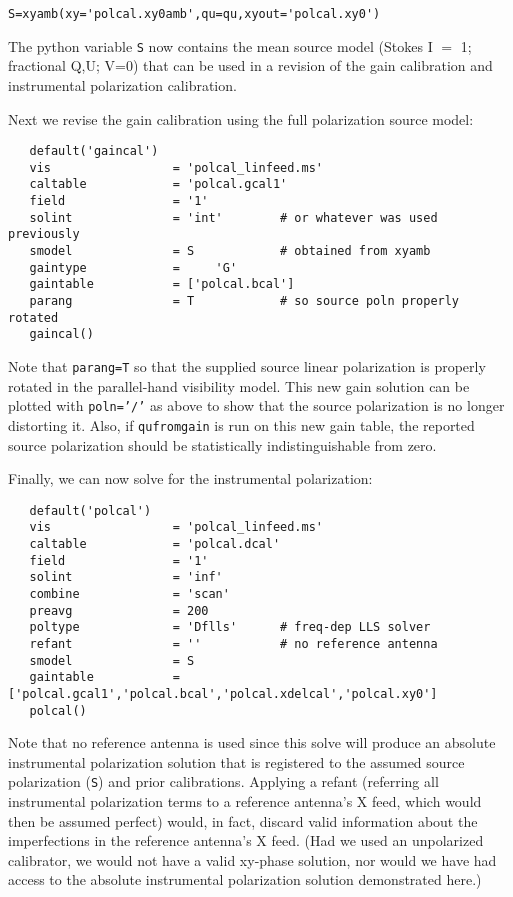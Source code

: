 \small
\begin{verbatim}
S=xyamb(xy='polcal.xy0amb',qu=qu,xyout='polcal.xy0')
\end{verbatim}
\normalsize 

The python variable {\tt S} now contains the mean
source model (Stokes I $=$ 1; fractional Q,U; V=0)
that can be used in a revision of the gain calibration
and instrumental polarization calibration.

Next we revise the gain calibration using the full polarization
source model:

\small
\begin{verbatim}
   default('gaincal')
   vis                 = 'polcal_linfeed.ms'
   caltable            = 'polcal.gcal1'   
   field               = '1'         
   solint              = 'int'        # or whatever was used previously
   smodel              = S            # obtained from xyamb
   gaintype            =     'G'        
   gaintable           = ['polcal.bcal']
   parang              = T            # so source poln properly rotated
   gaincal()
\end{verbatim}
\normalsize 

Note that {\tt parang=T} so that the supplied source linear
polarization is properly rotated in the parallel-hand visibility
model.  This new gain solution can be plotted with {\tt poln='/'} as
above to show that the source polarization is no longer distorting it.
Also, if {\tt qufromgain} is run on this new gain table, the reported
source polarization should be statistically indistinguishable from
zero.

Finally, we can now solve for the instrumental polarization:

\small
\begin{verbatim}
   default('polcal')
   vis                 = 'polcal_linfeed.ms'
   caltable            = 'polcal.dcal'
   field               = '1'
   solint              = 'inf'
   combine             = 'scan'
   preavg              = 200
   poltype             = 'Dflls'      # freq-dep LLS solver
   refant              = ''           # no reference antenna
   smodel              = S
   gaintable           = ['polcal.gcal1','polcal.bcal','polcal.xdelcal','polcal.xy0']
   polcal()
\end{verbatim}
\normalsize


Note that no reference antenna is used since this solve will produce
an absolute instrumental polarization solution that is registered
to the assumed source polarization ({\tt S}) and prior calibrations.
Applying a refant (referring all instrumental polarization terms
to a reference antenna's X feed, which would then be assumed perfect)
would, in fact, discard valid information about the imperfections
in the reference antenna's X feed.  (Had we used an unpolarized
calibrator, we would not have a valid xy-phase solution, nor would
we have had access to the absolute instrumental polarization solution
demonstrated here.)


